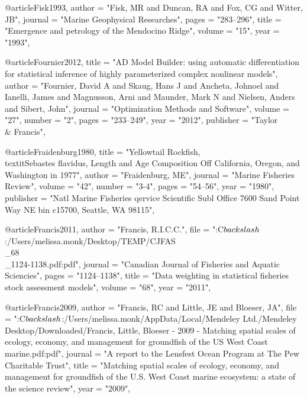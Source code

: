 @article{Fisk1993,
    author = "{Fisk, MR and Duncan, RA and Fox, CG and Witter, JB}",
    journal = "{Marine Geophysical Researches}",
    pages = "{283--296}",
    title = "{{Emergence and petrology of the Mendocino Ridge}}",
    volume = "{15}",
    year = "{1993}",
}

@article{Fournier2012,
    title = "{AD Model Builder: using automatic differentiation for statistical inference of highly parameterized complex nonlinear models}",
    author = "{Fournier, David A and Skaug, Hans J and Ancheta, Johnoel and Ianelli, James and Magnusson, Arni and Maunder, Mark N and Nielsen, Anders and Sibert, John}",
    journal = "{Optimization Methods and Software}",
    volume = "{27}",
    number = "{2}",
    pages = "{233--249}",
    year = "{2012}",
    publisher = "{Taylor \\& Francis}",
}

@article{Fraidenburg1980,
    title = "{Yellowtail Rockfish, \\textit{{{Sebastes}} flavidus}, Length and Age Composition Off California, Oregon, and Washington in 1977}",
    author = "{Fraidenburg, ME}",
    journal = "{Marine Fisheries Review}",
    volume = "{42}",
    number = "{3-4}",
    pages = "{54--56}",
    year = "{1980}",
    publisher = "{Natl Marine Fisheries qervice Scientific Subl Office 7600 Sand Point Way NE bin c15700, Seattle, WA 98115}",
}

@article{Francis2011,
    author = "{Francis, R.I.C.C.}",
    file = "{:C$\\backslash$:/Users/melissa.monk/Desktop/TEMP/CJFAS\\_68\\_1124-1138.pdf:pdf}",
    journal = "{Canadian Journal of Fisheries and Aquatic Sciencies}",
    pages = "{1124--1138}",
    title = "{{Data weighting in statistical fisheries stock assessment models}}",
    volume = "{68}",
    year = "{2011}",
}

@article{Francis2009,
    author = "{Francis, RC and Little, JE and Bloeser, JA}",
    file = "{:C$\\backslash$:/Users/melissa.monk/AppData/Local/Mendeley Ltd./Mendeley Desktop/Downloaded/Francis, Little, Bloeser - 2009 - Matching spatial scales of ecology, economy, and management for groundfish of the US West Coast marine.pdf:pdf}",
    journal = "{A report to the Lensfest Ocean Program at The Pew Charitable Trust}",
    title = "{{Matching spatial scales of ecology, economy, and management for groundfish of the U.S. West Coast marine ecosystem: a state of the science review}}",
    year = "{2009}",
}

